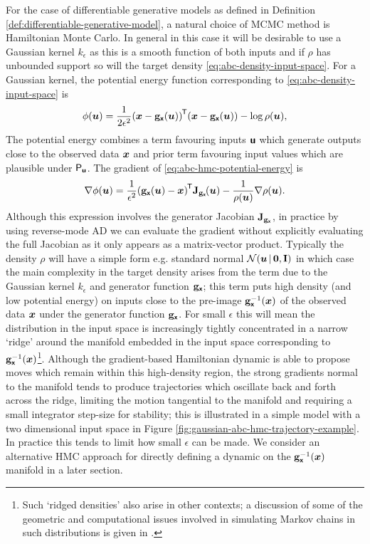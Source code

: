 For the case of differentiable generative models as defined in Definition \ref{def:differentiable-generative-model}, a natural choice of \ac{MCMC} method is Hamiltonian Monte Carlo. In general in this case it will be desirable to use a Gaussian kernel $k_{\epsilon}$ as this is a smooth function of both inputs and if $\rho$ has unbounded support so will the target density \eqref{eq:abc-density-input-space}. For a Gaussian kernel, the potential energy function corresponding to \eqref{eq:abc-density-input-space} is
\begin{equation}\label{eq:abc-hmc-potential-energy}
  \phi(\vct{u}) = \frac{1}{2\epsilon^2} 
  \lpa \vct{x} - \genfunc_{\rvct{x}}(\vct{u}) \rpa\tr\lpa \vct{x} - \genfunc_{\rvct{x}}(\vct{u}) \rpa -
  \log\rho(\vct{u}),
\end{equation}
The potential energy combines a term favouring inputs $\boldsymbol{\mathsf{u}}$ which generate outputs close to the observed data $\boldsymbol{x}$ and prior term favouring input values which are plausible under $\mathsf{P}_{\boldsymbol{\mathsf{u}}}$. The gradient of \eqref{eq:abc-hmc-potential-energy} is
\begin{equation}
  \grad{\phi}{\vct{u}} =
  \frac{1}{\epsilon^2} 
  \lpa \genfunc_{\rvct{x}}(\vct{u}) - \vct{x} \rpa\tr\jacob{\genfunc_{\rvct{x}}}{\vct{u}} - 
  \frac{1}{\rho(\vct{u})} \grad{\rho}{\vct{u}}.
\end{equation}
Although this expression involves the generator Jacobian $\mathbf{J}_{{\mathbf{g}}_{\boldsymbol{\mathsf{x}}}}$, in practice by using reverse-mode \ac{AD} we can evaluate the gradient without explicitly evaluating the full Jacobian as it only appears as a matrix-vector product. Typically the density $\rho$ will have a simple form e.g. standard normal $\nrm{\vct{u}\gvn\vct{0},\idmtx}$ in which case the main complexity in the target density arises from the term due to the Gaussian kernel $k_\epsilon$ and generator function ${\mathbf{g}}_{\boldsymbol{\mathsf{x}}}$; this term puts high density (and low potential energy) on inputs close to the pre-image ${\mathbf{g}}_{\boldsymbol{\mathsf{x}}}^{-1}(\boldsymbol{x})$ of the observed data $\boldsymbol{x}$ under the generator function ${\mathbf{g}}_{\boldsymbol{\mathsf{x}}}$. For small $\epsilon$ this will mean the distribution in the input space is increasingly tightly concentrated in a narrow `ridge' around the manifold embedded in the input space corresponding to ${\mathbf{g}}_{\boldsymbol{\mathsf{x}}}^{-1}(\boldsymbol{x})$\footnote{Such `ridged densities' also arise in other contexts; a discussion of some of the geometric and computational issues involved in simulating Markov chains in such distributions is given in \citep{beskos2015asymptotic}.}. Although the gradient-based Hamiltonian dynamic is able to propose moves which remain within this high-density region, the strong gradients normal to the manifold tends to produce trajectories which oscillate back and forth across the ridge, limiting the motion tangential to the manifold and requiring a small integrator step-size for stability; this is illustrated in a simple model with a two dimensional input space in Figure \ref{fig:gaussian-abc-hmc-trajectory-example}. In practice this tends to limit how small $\epsilon$ can be made. We consider an alternative \ac{HMC} approach for directly defining a dynamic on the ${\mathbf{g}}_{\boldsymbol{\mathsf{x}}}^{-1}(\boldsymbol{x})$ manifold in a later section.

